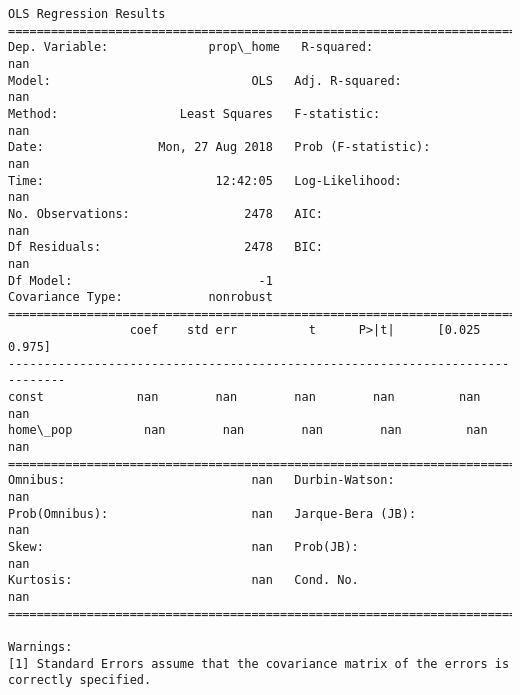 \documentclass[11pt]{article}
\begin{document}
    \begin{Verbatim}[commandchars=\\\{\}]
                            OLS Regression Results                            
==============================================================================
Dep. Variable:              prop\_home   R-squared:                         nan
Model:                            OLS   Adj. R-squared:                    nan
Method:                 Least Squares   F-statistic:                       nan
Date:                Mon, 27 Aug 2018   Prob (F-statistic):                nan
Time:                        12:42:05   Log-Likelihood:                    nan
No. Observations:                2478   AIC:                               nan
Df Residuals:                    2478   BIC:                               nan
Df Model:                          -1                                         
Covariance Type:            nonrobust                                         
==============================================================================
                 coef    std err          t      P>|t|      [0.025      0.975]
------------------------------------------------------------------------------
const             nan        nan        nan        nan         nan         nan
home\_pop          nan        nan        nan        nan         nan         nan
==============================================================================
Omnibus:                          nan   Durbin-Watson:                     nan
Prob(Omnibus):                    nan   Jarque-Bera (JB):                  nan
Skew:                             nan   Prob(JB):                          nan
Kurtosis:                         nan   Cond. No.                          nan
==============================================================================

Warnings:
[1] Standard Errors assume that the covariance matrix of the errors is correctly specified.

    \end{Verbatim}
\end{document}
